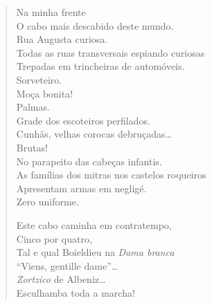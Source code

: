 {\begin{verse}
Na minha frente\\
O cabo mais descabido deste mundo.\\
Rua Augusta curiosa.\\
Todas as ruas transversais espiando curiosas\\
Trepadas em trincheiras de automóveis.\\
Sorveteiro.\\
Moça bonita!\\
Palmas.\\
Grade dos escoteiros perfilados.\\
Cunhãs, velhas corocas debruçadas\ldots{}\\
\qquad\quad\qquad\quad\qquad\quad\qquad\quad\qquad\quad Brutas!\\
No parapeito das cabeças infantis.\\
As famílias dos mitras nos castelos roqueiros\\
Apresentam armas em negligé.\\
\qquad\quad\qquad\qquad Zero uniforme.

Este cabo caminha em contratempo,\\
\qquad\qquad\qquad\quad Cinco por quatro,\\
\qquad\qquad Tal e qual Boieldieu na \emph{Dama branca}\\
\qquad ``Viens, gentille dame''\ldots{}\\
\quad\emph{Zortzico} de Albeniz\ldots{}\\
Esculhamba toda a marcha!


\end{verse}}
